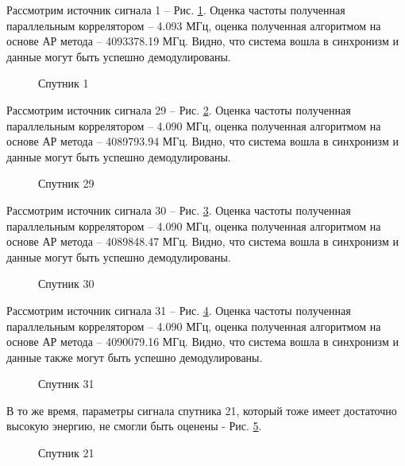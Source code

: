 Рассмотрим источник сигнала 1 – Рис. \ref{pic:5mhz_sat_1}. Оценка частоты полученная параллельным коррелятором – 4.093 МГц,
оценка полученная алгоритмом на основе АР метода – 4093378.19 МГц. Видно, что система вошла в синхронизм и данные могут быть успешно демодулированы.
\begin{figure}[h]
\center{}
	\caption{Спутник 1}
	\label{pic:5mhz_sat_1}
\end{figure}

Рассмотрим источник сигнала 29 – Рис. \ref{pic:5mhz_sat_29}. Оценка частоты полученная параллельным коррелятором – 4.090 МГц,
оценка полученная алгоритмом на основе АР метода – 4089793.94 МГц. Видно, что система вошла в синхронизм и данные могут быть успешно демодулированы.
\begin{figure}[h]
\center{}
	\caption{Спутник 29}
	\label{pic:5mhz_sat_29}
\end{figure}

Рассмотрим источник сигнала 30 – Рис. \ref{pic:5mhz_sat_30}. Оценка частоты полученная параллельным коррелятором – 4.090 МГц,
оценка полученная алгоритмом на основе АР метода – 4089848.47 МГц. Видно, что система вошла в синхронизм и данные могут быть успешно демодулированы.
\begin{figure}[h]
\center{}
	\caption{Спутник 30}
	\label{pic:5mhz_sat_30}
\end{figure}

Рассмотрим источник сигнала 31 – Рис. \ref{pic:5mhz_sat_31}. Оценка частоты полученная параллельным коррелятором – 4.090 МГц,
оценка полученная алгоритмом на основе АР метода – 4090079.16 МГц. Видно, что система вошла в синхронизм и данные также могут быть успешно демодулированы.
\begin{figure}[h]
\center{}
	\caption{Спутник 31}
	\label{pic:5mhz_sat_31}
\end{figure}

В то же время, параметры сигнала спутника 21, который тоже имеет достаточно высокую энергию, не смогли быть оценены - Рис. \ref{pic:5mhz_sat_21}.
\begin{figure}[h]
\center{}
	\caption{Спутник 21}
	\label{pic:5mhz_sat_21}
\end{figure}

